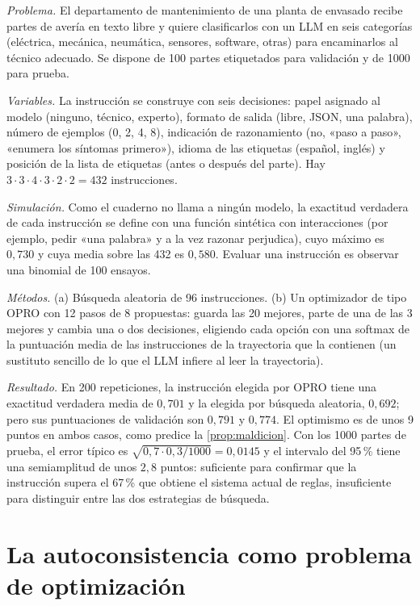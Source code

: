 \begin{ejemplo}\label{ej:caso-prompt}
\emph{Problema.} El departamento de mantenimiento de una planta de envasado recibe partes de avería en texto libre y quiere clasificarlos con un LLM en seis categorías (eléctrica, mecánica, neumática, sensores, software, otras) para encaminarlos al técnico adecuado. Se dispone de 100 partes etiquetados para validación y de 1000 para prueba.

\emph{Variables.} La instrucción se construye con seis decisiones: papel asignado al modelo (ninguno, técnico, experto), formato de salida (libre, JSON, una palabra), número de ejemplos (0, 2, 4, 8), indicación de razonamiento (no, «paso a paso», «enumera los síntomas primero»), idioma de las etiquetas (español, inglés) y posición de la lista de etiquetas (antes o después del parte). Hay $3\cdot3\cdot4\cdot3\cdot2\cdot2=432$ instrucciones.

\emph{Simulación.} Como el cuaderno no llama a ningún modelo, la exactitud verdadera de cada instrucción se define con una función sintética con interacciones (por ejemplo, pedir «una palabra» y a la vez razonar perjudica), cuyo máximo es $0{,}730$ y cuya media sobre las 432 es $0{,}580$. Evaluar una instrucción es observar una binomial de 100 ensayos.

\emph{Métodos.} (a) Búsqueda aleatoria de 96 instrucciones. (b) Un optimizador de tipo OPRO con 12 pasos de 8 propuestas: guarda las 20 mejores, parte de una de las 3 mejores y cambia una o dos decisiones, eligiendo cada opción con una softmax de la puntuación media de las instrucciones de la trayectoria que la contienen (un sustituto sencillo de lo que el LLM infiere al leer la trayectoria).

\emph{Resultado.} En 200 repeticiones, la instrucción elegida por OPRO tiene una exactitud verdadera media de $0{,}701$ y la elegida por búsqueda aleatoria, $0{,}692$; pero sus puntuaciones de validación son $0{,}791$ y $0{,}774$. El optimismo es de unos 9 puntos en ambos casos, como predice la \cref{prop:maldicion}. Con los 1000 partes de prueba, el error típico es $\sqrt{0{,}7\cdot0{,}3/1000}=0{,}0145$ y el intervalo del 95\,\% tiene una semiamplitud de unos $2{,}8$ puntos: suficiente para confirmar que la instrucción supera el 67\,\% que obtiene el sistema actual de reglas, insuficiente para distinguir entre las dos estrategias de búsqueda.
\end{ejemplo}

\section{La autoconsistencia como problema de optimización}

